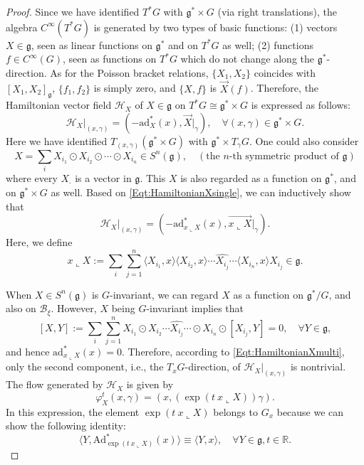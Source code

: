 \documentclass[12pt]{amsart}
\theoremstyle{definition}
\numberwithin{equation}{section}
\newcommand{\Hamiltonian}[1]{\mathcal{H}_{#1}}
\newcommand{\gstar}{\mathfrak{g}^*}
\newcommand{\galgebra}{\mathfrak{g}}
\newcommand{\SET}[1]{\{#1\}}
\newcommand{\Bxi}{\mathcal{B}_{\xi}}
\newcommand{\Adjointaction}{\mathrm{Ad}}
\begin{document}
\begin{proof}
  Since we have identified $T^*G$ with $ \gstar\times G$ (via right translations), the algebra   $C^\infty(T^*G)$ is generated by two types of basic functions:  (1) vectors $X\in \galgebra$, seen as linear functions on $\gstar$ and on $T^*G$ as well; (2) functions $f\in C^\infty(G)$, seen as functions on $T^*G$ which do not change along the $\gstar$-direction. As for the Poisson bracket relations, $\SET{X_1,X_2}$ coincides with $[X_1,X_2]_{\galgebra}$, $\SET{f_1,f_2}$ is simply zero, and $\SET{X,f}$ is $\overrightarrow{X}(f)$. Therefore, the Hamiltonian vector field $\Hamiltonian{X}$ of $X\in \galgebra$ on $T^*G\cong \gstar \times G$ is expressed as follows: \begin{equation}\label{Eqt:HamiltonianXsingle}
\Hamiltonian{X}|_{(x,\gamma)}=(-\mathrm{ad}_X^*(x),\overrightarrow{X}|_{\gamma}),\quad \forall (x,\gamma)\in \gstar\times G.            
         \end{equation}
Here we have identified $ T_{(x,\gamma)}(\gstar\times G)$ with $\gstar\times T_{\gamma}G$.
 One could also consider 
 $$X=\sum_i X_{i_1}\odot X_{i_2} \odot \cdots \odot X_{i_n}\in S^n(\galgebra), \quad(\mbox{the $n$-th symmetric product of }\galgebra)  $$
where every $X_{\cdot}$ is a vector in $\galgebra$. This $X$ is also regarded as a function on $\gstar$, and on $\gstar\times G$ as well. Based on \eqref{Eqt:HamiltonianXsingle}, we can inductively show that
\begin{equation}\label{Eqt:HamiltonianXmulti}
\Hamiltonian{X}|_{(x,\gamma)}=
(-\mathrm{ad}_{x \llcorner X}^*(x),\overrightarrow{x\llcorner X}|_{\gamma}).            
         \end{equation}
         Here, we define 
         $$x\llcorner X:=\sum_i \sum_{j=1}^n \langle X_{i_1},x \rangle \langle X_{i_2},x \rangle   \cdots \widehat{X_{i_j}} \cdots \langle X_{i_n}, x \rangle X_{i_j} \in \galgebra. $$

When $X\in S^n(\galgebra)$ is $G$-invariant, we can regard $X$ as a function on $\gstar/G$, and also on $\Bxi$.  However, $X$ being $G$-invariant implies that 
\begin{equation}\label{Eqt:tempXGinvairantzero}
 [X,Y]:=\sum_i \sum_{j=1}^n  X_{i_1}  \odot X_{i_2}    \cdots \widehat{X_{i_j}} \cdots \odot X_{i_n} \odot [X_{i_j},Y]=0,\quad \forall Y \in \galgebra,
\end{equation}
and hence 
$\mathrm{ad}_{x \llcorner X}^*(x)=0$. Therefore, according to \eqref{Eqt:HamiltonianXmulti}, only the second component,  i.e., the $T_xG$-direction, of $\Hamiltonian{X}|_{(x,\gamma)}$  is nontrivial. The flow generated by $\Hamiltonian{X}$ is given by
\begin{equation}\label{Eqt:flowX} \varphi^t_X(x,\gamma)=(x,(\exp(t ~x\llcorner X))\gamma).
\end{equation}
 In this expression, the element $\exp(t ~x\llcorner X)$ belongs to $G_x$ because we can show the following identity:
 \begin{equation}\label{Eqt:temphere}
  \langle Y, \Adjointaction^*_{\exp(t ~x\llcorner X)}(x) \rangle \equiv \langle Y, x \rangle,\quad \forall Y\in \galgebra, t\in \mathbb{R}.
 \end{equation}
 

\end{proof}
\end{document}
